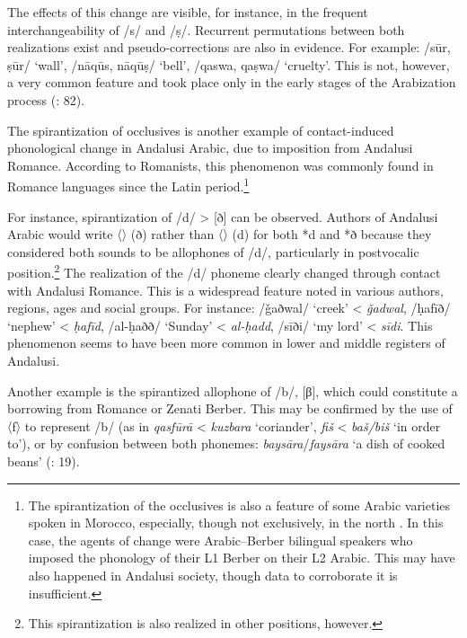 \documentclass[output=paper,modfonts,nonflat]{langsci/langscibook}
\begin{document}
The effects of this change are visible, for instance, in the frequent interchangeability of /s/ and /ṣ/. Recurrent permutations between both realizations exist and pseudo-corrections are also in evidence. For example: /sūr, ṣūr/ ‘wall’, /nāqūs, nāqūṣ/ ‘bell’, /qaswa, qaṣwa/ ‘cruelty’. This is not, however, a very common feature and took place only in the early stages of the Arabization process (\citealt{CorrientePereiraVicente2015}: 82). 

The spirantization of occlusives is another example of contact-induced phonological change in Andalusi Arabic, due to imposition from Andalusi Romance. According to Romanists, this phenomenon was commonly found in Romance languages since the Latin period.\footnote{The spirantization of the occlusives is also a feature of some Arabic varieties spoken in Morocco, especially, though not exclusively, in the north \citep[235--236]{SánchezVicente2012}. In this case, the agents of change were Arabic--Berber bilingual speakers who imposed the phonology of their L1 Berber on their L2 Arabic. This may have also happened in Andalusi society, though data to corroborate it is insufficient.}

For instance, spirantization of /d/ > [ð] can be observed. Authors of Andalusi Arabic would write 〈{}〉 (ð) rather than 〈{}〉 (d) for both *d and *ð because they considered both sounds to be allophones of /d/, particularly in postvocalic position.\footnote{This spirantization is also realized in other positions, however.}  The realization of the /d/ phoneme clearly changed through contact with Andalusi Romance. This is a widespread feature noted in various authors, regions, ages and social groups. For instance: {} /ǧaðwal/ ‘creek’ < \textit{ǧadwal}, {} /ḥafīð/ ‘nephew’ < \textit{ḥafīd}, {} /al-ḥaðð/ ‘Sunday’ < \textit{al-ḥadd}, {} /sīði/ ‘my lord’ < \textit{sīdi}. This phenomenon seems to have been more common in lower and middle registers of Andalusi. 

Another example is the spirantized allophone of /b/, [β], which could constitute a borrowing from Romance or Zenati Berber. This may be confirmed by the use of 〈f〉 to represent /b/ (as in {}  \textit{qasfūrā} < \textit{kuzbara} ‘coriander’, {}  \textit{fiš} < \textit{baš/biš} ‘in order to’), or by confusion between both phonemes: \textit{baysāra}/\textit{faysāra} ‘a dish of cooked beans’ (\citealt{CorrientePereiraVicente2015}: 19).
 
\end{document}
